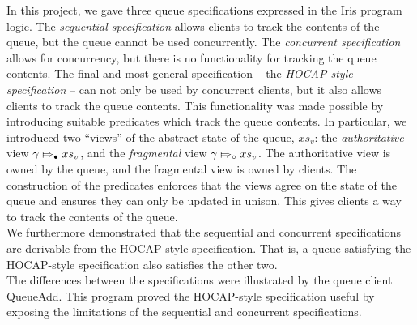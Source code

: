 \documentclass[a4paper, 10pt]{report}
\theoremstyle{definition}
\newcommand{\absvalueList}{xs_v}
\newcommand{\abstractstatefullfrag}[2]{#1 \Mapsto_{\circ} #2}
\newcommand{\abstractstateauth}[2]{#1 \Mapsto_{\bullet} #2}
\begin{document}
In this project, we gave three queue specifications expressed in the Iris program logic. The \textit{sequential specification} allows clients to track the contents of the queue, but the queue cannot be used concurrently. The \textit{concurrent specification} allows for concurrency, but there is no functionality for tracking the queue contents. The final and most general specification -- the \textit{HOCAP-style specification} -- can not only be used by concurrent clients, but it also allows clients to track the queue contents. This functionality was made possible by introducing suitable predicates which track the queue contents. In particular, we introduced two ``views'' of the abstract state of the queue, $\absvalueList$: the \textit{authoritative} view $\abstractstateauth{\gname}{\absvalueList}$, and the \textit{fragmental} view $\abstractstatefullfrag{\gname}{\absvalueList}$. The authoritative view is owned by the queue, and the fragmental view is owned by clients. The construction of the predicates enforces that the views agree on the state of the queue and ensures they can only be updated in unison. This gives clients a way to track the contents of the queue.\\
We furthermore demonstrated that the sequential and concurrent specifications are derivable from the HOCAP-style specification. That is, a queue satisfying the HOCAP-style specification also satisfies the other two.\\
The differences between the specifications were illustrated by the queue client QueueAdd. This program proved the HOCAP-style specification useful by exposing the limitations of the sequential and concurrent specifications.
\end{document}
